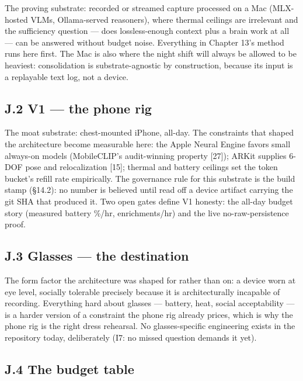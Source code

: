 The proving substrate: recorded or streamed capture processed on a Mac (MLX-hosted VLMs, Ollama-served reasoners), where thermal ceilings are irrelevant and the sufficiency question --- does lossless-enough context plus a brain work at all --- can be answered without budget noise. Everything in Chapter 13's method runs here first. The Mac is also where the night shift will always be allowed to be heaviest: consolidation is substrate-agnostic by construction, because its input is a replayable text log, not a device.

\subsection{J.2 V1 --- the phone rig}\label{j.2-v1-the-phone-rig}

The moat substrate: chest-mounted iPhone, all-day. The constraints that shaped the architecture become measurable here: the Apple Neural Engine favors small always-on models (MobileCLIP's audit-winning property {[}27{]}); ARKit supplies 6-DOF pose and relocalization {[}15{]}; thermal and battery ceilings set the token bucket's refill rate empirically. The governance rule for this substrate is the build stamp (\S{}14.2): no number is believed until read off a device artifact carrying the git SHA that produced it. Two open gates define V1 honesty: the all-day budget story (measured battery \%/hr, enrichments/hr) and the live no-raw-persistence proof.

\subsection{J.3 Glasses --- the destination}\label{j.3-glasses-the-destination}

The form factor the architecture was shaped for rather than on: a device worn at eye level, socially tolerable precisely because it is architecturally incapable of recording. Everything hard about glasses --- battery, heat, social acceptability --- is a harder version of a constraint the phone rig already prices, which is why the phone rig is the right dress rehearsal. No glasses-specific engineering exists in the repository today, deliberately (I7: no missed question demands it yet).

\subsection{J.4 The budget table}\label{j.4-the-budget-table}

